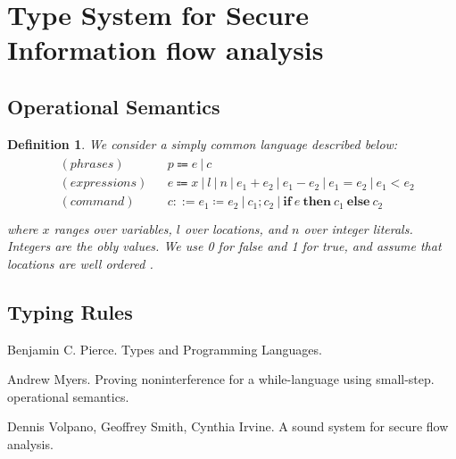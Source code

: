 \documentclass{article}
\newtheorem{definition}[theorem]{Definition}
\newcommand{\ifelse}[3]{\ensuremath{\textbf{if}~#1~\textbf{then}~#2~\textbf{else}~#3}}
\begin{document}
\newpage
\section{Type System for Secure Information flow analysis}

\subsection{Operational Semantics}

\begin{definition}
\rm We consider a simply common language described below:
\[
	\begin{gathered}
	\begin{aligned}
	&(phrases) && p \Coloneqq e~|~c \\
	&(expressions) && e \Coloneqq x ~|~ l ~|~ n ~|~ e_1 + e_2 ~|~ e_1 - e_2 ~|~ e_1 = e_2 ~|~ e_1 < e_2 \\
	&(command) && c ::= e_1 \coloneqq e_2 ~|~ c_1;c_2 ~|~ \ifelse{e}{c_1}{c_2} \\
	\end{aligned}
	\end{gathered}
\]
where $x$ ranges over variables, $l$ over locations, and $n$ over integer literals. Integers are the obly values. We use 0 for false and 1 for true, and assume that locations are well ordered \cite{DGC}.
\end{definition}



\subsection{Typing Rules}


\begin{thebibliography}{9}
Benjamin C. Pierce. Types and Programming Languages.

Andrew Myers. Proving noninterference for a while-language using small-step. operational semantics.

Dennis Volpano, Geoffrey Smith, Cynthia Irvine. A sound system for secure flow analysis.
\end{thebibliography}
\end{document}
